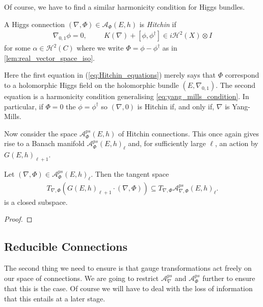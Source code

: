 \documentclass[12pt]{ociamthesis}  %
\begin{document}
Of course, we have to find a similar harmonicity condition for
Higgs bundles.

\begin{definition}
  A Higgs connection $(\nabla,\Phi)\in \mathcal A_\Phi(E,h)$
  is \emph{Hitchin} if
  \begin{align}\label{eq:Hitchin_equations}
    \nabla_{0,1}\phi = 0,\hspace{1cm}
    K(\nabla) + [\phi,\phi^\dagger] \in i\mathcal H^2(X)\otimes I
  \end{align}
  for some $\alpha\in\mathcal H^2(C)$ where we write
  $\Phi = \phi - \phi^\dagger$ as in \ref{lem:real_vector_space_iso}.
\end{definition}

Here the first equation in (\ref{eq:Hitchin_equations}) merely says that $\Phi$
correspond to a holomorphic Higgs field on the holomorphic bundle
$(E,\nabla_{0,1})$.  The second equation is a harmonicity condition generalising
\ref{eq:yang_mills_condition}. In particular, if $\Phi = 0$ the $\phi =
  \phi^\dagger$ so $(\nabla,0)$ is Hitchin if, and only if, $\nabla$ is
Yang-Mills.

Now consider the space $\mathcal A_\Phi^{ps}(E,h)$ of Hitchin connections.
This once again gives rise to a Banach manifold $\mathcal A_\Phi^{ps}(E,h)_\ell$
and, for sufficiently large $\ell$, an action by $G(E,h)_{\ell+1}$.

\begin{lemma}
  Let $(\nabla,\Phi)\in\mathcal A_\Phi^{ps}(E,h)_\ell$. Then the tangent space
  \begin{align*}
    T_{\nabla,\Phi}(G(E,h)_{\ell+1}\cdot(\nabla,\Phi))
    \subseteq T_{\nabla,\Phi}\mathcal A_{\nabla,\Phi}^{ps}(E,h)_\ell.
  \end{align*}
  is a closed subspace.
  \begin{proof}
    \missingproof
  \end{proof}
\end{lemma}

\subsection{Reducible Connections}

The second thing we need to ensure is that gauge transformations act freely on
our space of connections. We are going to restrict $\mathcal A^{ps}_\nabla$ and
$\mathcal A^{ps}_\Phi$ further to ensure that this is the case. Of course we will have
to deal with the loss of information that this entails at a later stage.
\end{document}
